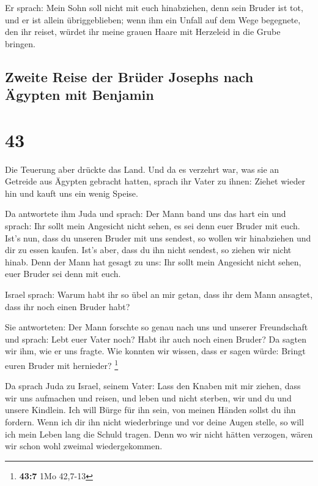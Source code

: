  Er sprach: Mein Sohn soll nicht mit euch hinabziehen,
denn sein Bruder ist tot, und er ist allein übriggeblieben; wenn ihm ein
Unfall auf dem Wege begegnete, den ihr reiset, würdet ihr meine grauen
Haare mit Herzeleid in die Grube bringen.

\hypertarget{zweite-reise-der-bruxfcder-josephs-nach-uxe4gypten-mit-benjamin}{%
\subsection{Zweite Reise der Brüder Josephs nach Ägypten mit
Benjamin}\label{zweite-reise-der-bruxfcder-josephs-nach-uxe4gypten-mit-benjamin}}

\hypertarget{section-42}{%
\section{43}\label{section-42}}

 Die Teuerung aber drückte das Land.  Und da
es verzehrt war, was sie an Getreide aus Ägypten gebracht hatten, sprach
ihr Vater zu ihnen: Ziehet wieder hin und kauft uns ein wenig Speise.

 Da antwortete ihm Juda und sprach: Der Mann band uns das
hart ein und sprach: Ihr sollt mein Angesicht nicht sehen, es sei denn
euer Bruder mit euch.  Ist's nun, dass du unseren Bruder
mit uns sendest, so wollen wir hinabziehen und dir zu essen kaufen.
 Ist's aber, dass du ihn nicht sendest, so ziehen wir
nicht hinab. Denn der Mann hat gesagt zu uns: Ihr sollt mein Angesicht
nicht sehen, euer Bruder sei denn mit euch.

 Israel sprach: Warum habt ihr so übel an mir getan, dass
ihr dem Mann ansagtet, dass ihr noch einen Bruder habt?

 Sie antworteten: Der Mann forschte so genau nach uns und
unserer Freundschaft und sprach: Lebt euer Vater noch? Habt ihr auch
noch einen Bruder? Da sagten wir ihm, wie er uns fragte. Wie konnten wir
wissen, dass er sagen würde: Bringt euren Bruder mit hernieder?
\footnote{\textbf{43:7} 1Mo 42,7-13}

 Da sprach Juda zu Israel, seinem Vater: Lass den Knaben
mit mir ziehen, dass wir uns aufmachen und reisen, und leben und nicht
sterben, wir und du und unsere Kindlein.  Ich will Bürge
für ihn sein, von meinen Händen sollst du ihn fordern. Wenn ich dir ihn
nicht wiederbringe und vor deine Augen stelle, so will ich mein Leben
lang die Schuld tragen.  Denn wo wir nicht hätten
verzogen, wären wir schon wohl zweimal wiedergekommen.


